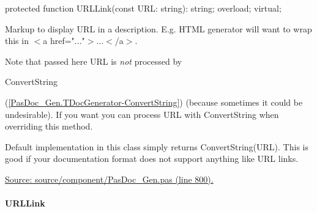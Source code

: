 \documentclass{report}
\newif\ifpdf
\begin{document}
\label{PasDoc_Gen.TDocGenerator-URLLink}
\begin{list}{}{
\setlength{\itemindent}{0cm}
\setlength{\listparindent}{0cm}
\setlength{\leftmargin}{\evensidemargin}
\addtolength{\leftmargin}{\tmplength}
\settowidth{\labelsep}{X}
\addtolength{\leftmargin}{\labelsep}
\setlength{\labelwidth}{\tmplength}
}
\item[\textbf{Declaration}\hfill]
\ifpdf
\begin{flushleft}
\fi
\begin{ttfamily}
protected function URLLink(const URL: string): string; overload; virtual;\end{ttfamily}

\ifpdf
\end{flushleft}
\fi

\par
\item[\textbf{Description}]
Markup to display URL in a description. E.g. HTML generator will want to wrap this in {$<$}a href="..."{$>$}...{$<$}/a{$>$}.

Note that passed here URL is \textit{not} processed by \begin{ttfamily}ConvertString\end{ttfamily}(\ref{PasDoc_Gen.TDocGenerator-ConvertString}) (because sometimes it could be undesirable). If you want you can process URL with ConvertString when overriding this method.

Default implementation in this class simply returns ConvertString(URL). This is good if your documentation format does not support anything like URL links.\par
\href{https://github.com/pasdoc/pasdoc/blob/master/source/component/PasDoc_Gen.pas#L800}{Source: source/component/PasDoc{\_}Gen.pas (line 800).}

\end{list}
\paragraph*{URLLink}\hspace*{\fill}
\end{document}
